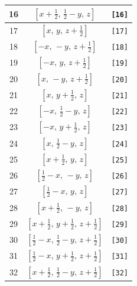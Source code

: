 \documentclass[fleqn,8pt]{jsarticle}
\begin{document}
\begin{longtable}{ccc}
16 & $\left[ x + \frac{1}{2},\, \frac{1}{2} - y,\, z \right]$ & {\tt [16]} \\ \hline
17 & $\left[ x,\, y,\, z + \frac{1}{2} \right]$ & {\tt [17]} \\ \hline
18 & $\left[ - x,\, - y,\, z + \frac{1}{2} \right]$ & {\tt [18]} \\ \hline
19 & $\left[ - x,\, y,\, z + \frac{1}{2} \right]$ & {\tt [19]} \\ \hline
20 & $\left[ x,\, - y,\, z + \frac{1}{2} \right]$ & {\tt [20]} \\ \hline
21 & $\left[ x,\, y + \frac{1}{2},\, z \right]$ & {\tt [21]} \\ \hline
22 & $\left[ - x,\, \frac{1}{2} - y,\, z \right]$ & {\tt [22]} \\ \hline
23 & $\left[ - x,\, y + \frac{1}{2},\, z \right]$ & {\tt [23]} \\ \hline
24 & $\left[ x,\, \frac{1}{2} - y,\, z \right]$ & {\tt [24]} \\ \hline
25 & $\left[ x + \frac{1}{2},\, y,\, z \right]$ & {\tt [25]} \\ \hline
26 & $\left[ \frac{1}{2} - x,\, - y,\, z \right]$ & {\tt [26]} \\ \hline
27 & $\left[ \frac{1}{2} - x,\, y,\, z \right]$ & {\tt [27]} \\ \hline
28 & $\left[ x + \frac{1}{2},\, - y,\, z \right]$ & {\tt [28]} \\ \hline
29 & $\left[ x + \frac{1}{2},\, y + \frac{1}{2},\, z + \frac{1}{2} \right]$ & {\tt [29]} \\ \hline
30 & $\left[ \frac{1}{2} - x,\, \frac{1}{2} - y,\, z + \frac{1}{2} \right]$ & {\tt [30]} \\ \hline
31 & $\left[ \frac{1}{2} - x,\, y + \frac{1}{2},\, z + \frac{1}{2} \right]$ & {\tt [31]} \\ \hline
32 & $\left[ x + \frac{1}{2},\, \frac{1}{2} - y,\, z + \frac{1}{2} \right]$ & {\tt [32]} \\
\end{longtable}
\end{document}

